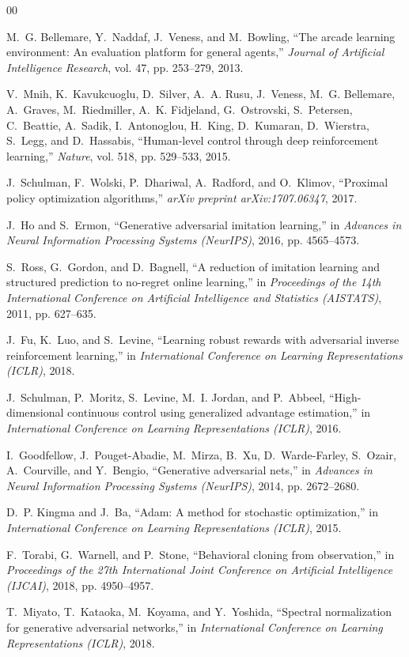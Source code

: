 \documentclass[conference]{IEEEtran}
\begin{document}
\begin{thebibliography}{00}

M.~G. Bellemare, Y.~Naddaf, J.~Veness, and M.~Bowling,
``The arcade learning environment: An evaluation platform for general agents,''
\textit{Journal of Artificial Intelligence Research}, vol. 47, pp. 253--279, 2013.

V.~Mnih, K.~Kavukcuoglu, D.~Silver, A.~A. Rusu, J.~Veness, M.~G. Bellemare,
A.~Graves, M.~Riedmiller, A.~K. Fidjeland, G.~Ostrovski, S.~Petersen, C.~Beattie,
A.~Sadik, I.~Antonoglou, H.~King, D.~Kumaran, D.~Wierstra, S.~Legg, and D.~Hassabis,
``Human-level control through deep reinforcement learning,''
\textit{Nature}, vol. 518, pp. 529--533, 2015.

J.~Schulman, F.~Wolski, P.~Dhariwal, A.~Radford, and O.~Klimov,
``Proximal policy optimization algorithms,''
\textit{arXiv preprint arXiv:1707.06347}, 2017.

J.~Ho and S.~Ermon,
``Generative adversarial imitation learning,''
in \textit{Advances in Neural Information Processing Systems (NeurIPS)}, 2016, pp. 4565--4573.

S.~Ross, G.~Gordon, and D.~Bagnell,
``A reduction of imitation learning and structured prediction to no-regret online learning,''
in \textit{Proceedings of the 14th International Conference on Artificial Intelligence
and Statistics (AISTATS)}, 2011, pp. 627--635.

J.~Fu, K.~Luo, and S.~Levine,
``Learning robust rewards with adversarial inverse reinforcement learning,''
in \textit{International Conference on Learning Representations (ICLR)}, 2018.

J.~Schulman, P.~Moritz, S.~Levine, M.~I. Jordan, and P.~Abbeel,
``High-dimensional continuous control using generalized advantage estimation,''
in \textit{International Conference on Learning Representations (ICLR)}, 2016.

I.~Goodfellow, J.~Pouget-Abadie, M.~Mirza, B.~Xu, D.~Warde-Farley, S.~Ozair,
A.~Courville, and Y.~Bengio,
``Generative adversarial nets,''
in \textit{Advances in Neural Information Processing Systems (NeurIPS)}, 2014,
pp. 2672--2680.

D.~P. Kingma and J.~Ba,
``Adam: A method for stochastic optimization,''
in \textit{International Conference on Learning Representations (ICLR)}, 2015.

F.~Torabi, G.~Warnell, and P.~Stone,
``Behavioral cloning from observation,''
in \textit{Proceedings of the 27th International Joint Conference on Artificial
Intelligence (IJCAI)}, 2018, pp. 4950--4957.

T.~Miyato, T.~Kataoka, M.~Koyama, and Y.~Yoshida,
``Spectral normalization for generative adversarial networks,''
in \textit{International Conference on Learning Representations (ICLR)}, 2018.

\end{thebibliography}
\end{document}
